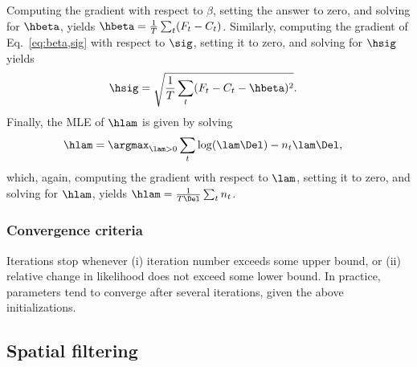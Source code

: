 \noindent Computing the gradient with respect to $\beta$, setting the answer to zero, and solving for $\hbeta$, yields $\hbeta = \frac{1}{T} \sum_t (F_t-C_t)$.  Similarly, computing the gradient of Eq.~\eqref{eq:beta,sig} with respect to $\sig$, setting it to zero, and solving for $\hsig$ yields
\begin{align}
\hsig &= \sqrt{\frac{1}{T} \sum_t (F_t - C_t - \hbeta)^2}.
\end{align}
Finally, the MLE of $\hlam$ is given by solving 
\begin{align}
\hlam &= \argmax_{\lam>0} \sum_t \log (\lam \Del) - n_t \lam \Del,
\end{align}
which, again, computing the gradient with respect to $\lam$, setting it to zero, and solving for $\hlam$, yields $\hlam=\frac{1}{T\Del}\sum_t n_t$.

\subsubsection{Convergence criteria}

Iterations stop whenever (i) iteration number exceeds some upper bound, or (ii) relative change in likelihood does not exceed some lower bound.  In practice, parameters tend to converge after several iterations, given the above initializations. 


\subsection{Spatial filtering} \label{sec:methods:spatial}

